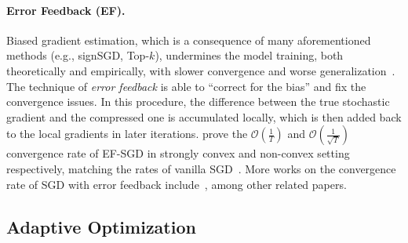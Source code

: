\documentclass[11pt]{article}
\begin{document}
\paragraph{Error Feedback (EF).} Biased gradient estimation, which is a consequence of many aforementioned methods (e.g., signSGD, Top-$k$), undermines the model training, both theoretically and empirically, with slower convergence and worse generalization~\cite{ajalloeian2020analysis,Arxiv:Beznosikov20}. The technique of \textit{error feedback} is able to ``correct for the bias'' and fix the convergence issues. 
In this procedure, the difference between the true stochastic gradient and the compressed one is accumulated locally, which is then added back to the local gradients in later iterations. \cite{stich2018sparsified,karimireddy2019error} prove the $\mathcal O(\frac{1}{T})$ and $\mathcal O(\frac{1}{\sqrt T})$ convergence rate of EF-SGD in strongly convex and non-convex setting respectively, matching the rates of vanilla SGD~\cite{nemirovski2009robust,ghadimi2013stochastic}. More works on the convergence rate of SGD with error feedback include~\cite{Proc:Zheng_NIPS19,Article:Stich_arxiv19}, among other related papers.


\subsection{Adaptive Optimization}
\end{document}
